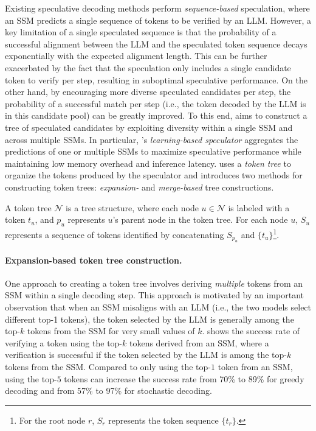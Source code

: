 Existing speculative decoding methods perform {\em sequence-based} speculation, where an SSM predicts a single sequence of tokens to be verified by an LLM.
However, a key limitation of a single speculated sequence is that the probability of a successful alignment between the LLM and the speculated token sequence decays exponentially with the expected alignment length.
This can be further exacerbated by the fact that the speculation only includes a single candidate token to verify per step, resulting in suboptimal speculative performance.
On the other hand, by encouraging more diverse speculated candidates per step, the probability of a successful match per step (i.e., the token decoded by the LLM is in this candidate pool) can be greatly improved.
To this end, \SpecInfer aims to construct a tree of speculated candidates by exploiting diversity within a single SSM and across multiple SSMs.
In particular, \SpecInfer's {\em learning-based speculator} aggregates the predictions of one or multiple SSMs to maximize speculative performance while maintaining low memory overhead and inference latency.
\SpecInfer uses a {\em token tree} to organize the tokens produced by the speculator and introduces two methods for constructing token trees: {\em expansion-} and {\em merge-based} tree constructions.

\begin{definition}
\label{specinfer:def:token_tree}
A token tree $\mathcal{N}$ is a tree structure, where each node $u \in \mathcal{N}$ is labeled with a token $t_u$, and $p_u$ represents $u$'s parent node in the token tree.
For each node $u$, $S_u$ represents a sequence of tokens identified by concatenating $S_{p_u}$ and $\{t_u\}$\footnote{For the root node $r$, $S_r$ represents the token sequence $\{t_r\}$.}.
\end{definition}

\paragraph{Expansion-based token tree construction.}
One approach to creating a token tree involves deriving {\em multiple} tokens from an SSM within a single decoding step.
This approach is motivated by an important observation that when an SSM misaligns with an LLM (i.e., the two models select different top-1 tokens), the token selected by the LLM is generally among the top-$k$ tokens from the SSM for very small values of $k$.
 shows the success rate of verifying a token using the top-$k$ tokens derived from an SSM, where a verification is successful if the token selected by the LLM is among the top-$k$ tokens from the SSM. Compared to only using the top-$1$ token from an SSM, using the top-$5$ tokens can increase the success rate from 70\% to 89\% for greedy decoding and from 57\% to 97\% for stochastic decoding.

